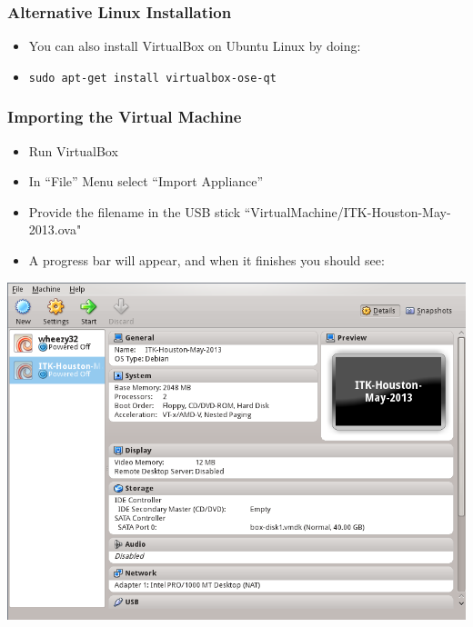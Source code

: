 \begin{frame}
\frametitle{Alternative Linux Installation}
\begin{itemize}
\item You can also install VirtualBox on Ubuntu Linux by doing:
\item \texttt{sudo apt-get install virtualbox-ose-qt}
\end{itemize}
\end{frame}

\begin{frame}
\frametitle{Importing the Virtual Machine}
\begin{itemize}
\item Run VirtualBox
\item In ``File'' Menu select ``Import Appliance''
\item Provide the filename in the USB stick ``VirtualMachine/ITK-Houston-May-2013.ova"
\item A progress bar will appear, and when it finishes you should see:
\end{itemize}
\begin{center}
  \includegraphics[width=0.5\paperwidth]{../Art/Screenshot-VirtualBox-OSE-01.png}
\end{center}
\end{frame}

